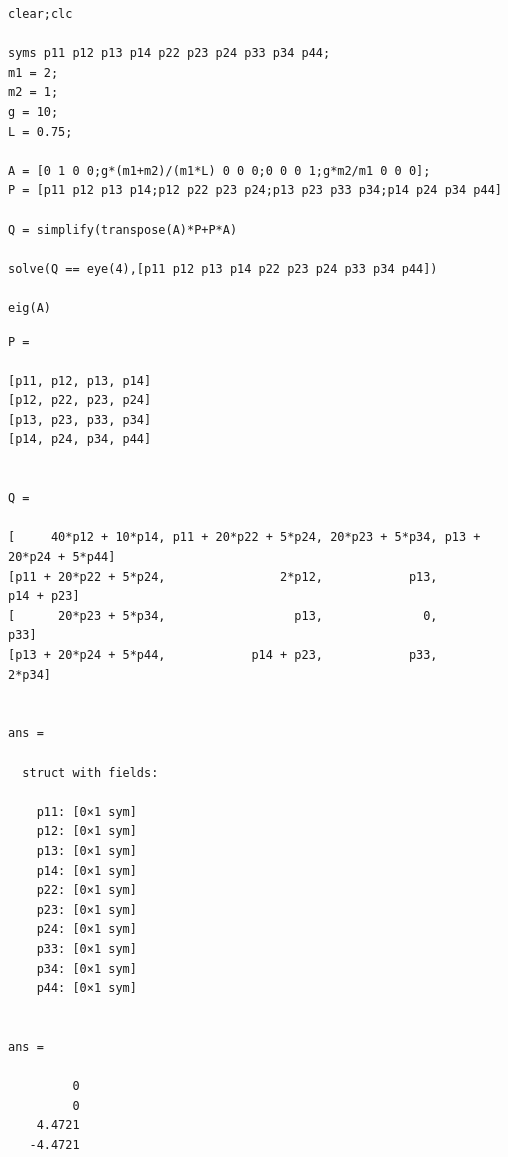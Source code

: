 \documentclass[12pt]{article}
\numberwithin{equation}{section}
\begin{document}
    \begin{verbatim}
clear;clc

syms p11 p12 p13 p14 p22 p23 p24 p33 p34 p44;
m1 = 2;
m2 = 1;
g = 10;
L = 0.75;

A = [0 1 0 0;g*(m1+m2)/(m1*L) 0 0 0;0 0 0 1;g*m2/m1 0 0 0];
P = [p11 p12 p13 p14;p12 p22 p23 p24;p13 p23 p33 p34;p14 p24 p34 p44]

Q = simplify(transpose(A)*P+P*A)

solve(Q == eye(4),[p11 p12 p13 p14 p22 p23 p24 p33 p34 p44])

eig(A)
\end{verbatim}

        \color{lightgray} \begin{verbatim} 
P =
 
[p11, p12, p13, p14]
[p12, p22, p23, p24]
[p13, p23, p33, p34]
[p14, p24, p34, p44]
 
 
Q =
 
[     40*p12 + 10*p14, p11 + 20*p22 + 5*p24, 20*p23 + 5*p34, p13 + 20*p24 + 5*p44]
[p11 + 20*p22 + 5*p24,                2*p12,            p13,            p14 + p23]
[      20*p23 + 5*p34,                  p13,              0,                  p33]
[p13 + 20*p24 + 5*p44,            p14 + p23,            p33,                2*p34]
 

ans = 

  struct with fields:

    p11: [0×1 sym]
    p12: [0×1 sym]
    p13: [0×1 sym]
    p14: [0×1 sym]
    p22: [0×1 sym]
    p23: [0×1 sym]
    p24: [0×1 sym]
    p33: [0×1 sym]
    p34: [0×1 sym]
    p44: [0×1 sym]


ans =

         0
         0
    4.4721
   -4.4721

\end{verbatim} \color{black}
\end{document}
